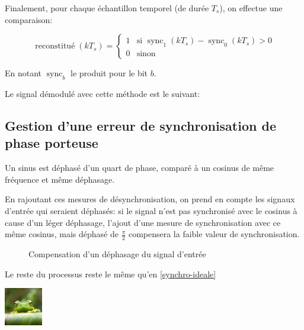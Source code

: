 \documentclass{article}
\begin{document}
Finalement, pour chaque échantillon temporel (de durée $T_s$), on effectue une comparaison:

$$
\operatorname{reconstitué}(kT_s) = \begin{cases}
    1 & \text{si } \operatorname{sync}_1(kT_s) - \operatorname{sync}_0(kT_s) > 0 \\
    0 & \text{sinon}
\end{cases}
$$

En notant $\operatorname{sync}_b$ le produit pour le bit $b$.

Le signal démodulé avec cette méthode est le suivant:


\begin{figure}
\end{figure}



\subsection{Gestion d'une erreur de synchronisation de phase porteuse}

Un sinus est déphasé d'un quart de phase, comparé à un cosinus de même fréquence et même déphasage.

En rajoutant ces mesures de désynchronisation, on prend en compte les signaux d'entrée qui seraient déphasés: si le signal n'est pas synchronisé avec le cosinus à cause d'un léger déphasage, l'ajout d'une mesure de synchronisation avec ce même cosinus, mais déphasé de $\frac{\pi}{2}$ compensera la faible valeur de synchronisation.

\begin{figure}[H]
	\centering
	\caption{Compensation d'un déphasage du signal d'entrée}
	\label{fig:compensation-dephasage}
\end{figure}

Le reste du processus reste le même qu'en \ref{synchro-ideale}




\begin{center}
    \includegraphics[width=0.125\textwidth]{frog.jpg}
\end{center}
\end{document}
